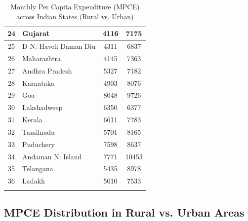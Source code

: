\documentclass{article}
\begin{document}
\begin{longtable}{|c|l|c|c|}
		24  & Gujarat                      & 4116  & 7175 \\ \hline
		25  & D  N. Haveli  Daman  Diu  & 4311  & 6837 \\ \hline
		26  & Maharashtra                  & 4145  & 7363 \\ \hline
		27  & Andhra Pradesh               & 5327  & 7182 \\ \hline
		28  & Karnataka                    & 4903  & 8076 \\ \hline
		29  & Goa                          & 8048  & 9726 \\ \hline
		30  & Lakshadweep                  & 6350  & 6377 \\ \hline
		31  & Kerala                       & 6611  & 7783 \\ \hline
		32  & Tamilnadu                    & 5701  & 8165 \\ \hline
		33  & Puduchery                    & 7598  & 8637 \\ \hline
		34  & Andaman N. Island          & 7771  & 10453 \\ \hline
		35  & Telangana                    & 5435  & 8978 \\ \hline
		36  & Ladakh                       & 5010  & 7533 \\ \hline
		
		\caption{Monthly Per Capita Expenditure (MPCE) across Indian States (Rural vs. Urban)}
		\label{table:mpce_states}
	\end{longtable}
	






\subsection{ MPCE Distribution in Rural vs. Urban Areas }
\end{document}

